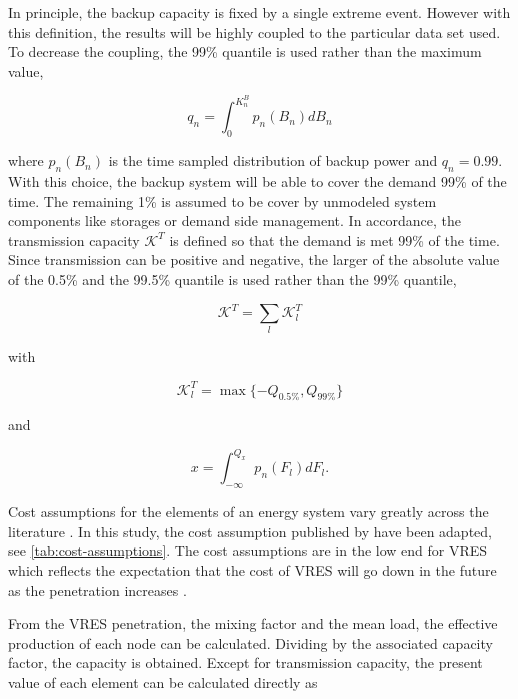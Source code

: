 \documentclass[a4paper, 5p, sort&compress]{elsarticle}%
\begin{document}
In principle, the backup capacity is fixed by a single extreme
event. However with this definition, the results will be highly
coupled to the particular data set used. To decrease the coupling, the
99\% quantile is used rather than the maximum value,

\begin{equation}
  \label{eq:2}
  q_{n} = \int _{0} ^{K_{n}^{B}} p_{n}(B_{n})dB_{n}
\end{equation}

where $p_{n}(B_{n})$ is the time sampled distribution of backup power
and $q_{n} = 0.99$. With this choice, the backup system will be able
to cover the demand 99\% of the time. The remaining 1\% is assumed to
be cover by unmodeled system components like storages or demand side
management. In accordance, the transmission capacity $\mathcal{K}^{T}$
is defined so that the demand is met 99\% of the time. Since
transmission can be positive and negative, the larger of the absolute
value of the 0.5\% and the 99.5\% quantile is used rather than the
99\% quantile,

\begin{equation}
  \label{eq:4}
  \mathcal{K}^{T} = \sum_{l} \mathcal{K}^{T}_{l} 
\end{equation}

with

\begin{equation}
  \label{eq:4}
  \mathcal{K}_{l}^{T} = \max \{-Q_{0.5\%} , Q_{99\%} \}
\end{equation}

and 

\begin{equation}
  \label{eq:4}
  x = \int_{-\infty}^{Q_{x}} p_{n}(F_{l}) dF_{l} .
\end{equation}

Cost assumptions for the elements of an energy system vary greatly
across the literature \cite{Sensitivity}. In this study, the cost assumption published by
\cite{Rolando} have been adapted, see \cref{tab:cost-assumptions}. The cost
assumptions are in the low end for VRES which reflects the expectation
that the cost of VRES will go down in the future as the penetration
increases \cite{Fraunhofer}.



From the VRES penetration, the mixing factor and the mean load, the
effective production of each node can be calculated. Dividing by the
associated capacity factor, the capacity is obtained. Except for
transmission capacity, the present value of each element can be
calculated directly as
\end{document}
